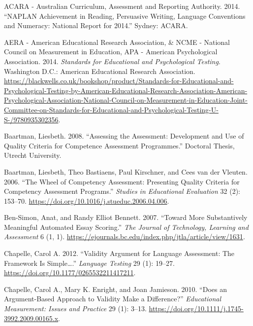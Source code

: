 \documentclass[
  letterpaper,
]{report}
\newlength{\cslhangindent}
\newlength{\cslentryspacingunit} %
\newenvironment{CSLReferences}[2] %
 {%
  \setlength{\parindent}{0pt}
  \ifodd #1
  \let\oldpar\par
  \def\par{\hangindent=\cslhangindent\oldpar}
  \fi
  \setlength{\parskip}{#2\cslentryspacingunit}
 }%
 {}
\begin{document}
\hypertarget{refs}{}
\begin{CSLReferences}{1}{0}
\leavevmode{}%
ACARA - Australian Curriculum, Assessment and Reporting Authority. 2014.
{``{NAPLAN Achievement} in {Reading}, {Persuasive Writing}, {Language
Conventions} and {Numeracy}: {National Report} for 2014.''} {Sydney}:
{ACARA}.

\leavevmode{}%
AERA - American Educational Research Association, \& NCME - National
Council on Measurement in Education, APA - American Psychological
Association. 2014. \emph{Standards for {Educational} and {Psychological
Testing}}. {Washington D.C.}: {American Educational Research
Association}.
\url{https://blackwells.co.uk/bookshop/product/Standards-for-Educational-and-Psychological-Testing-by-American-Educational-Research-Association-American-Psychological-Association-National-Council-on-Measurement-in-Education-Joint-Committee-on-Standards-for-Educational-and-Psychological-Testing-U-S-/9780935302356}.

\leavevmode{}%
Baartman, Liesbeth. 2008. {``Assessing the Assessment: {Development} and
Use of Quality Criteria for {Competence Assessment Programmes}.''}
Doctoral Thesis, {Utrecht University}.

\leavevmode{}%
Baartman, Liesbeth, Theo Bastiaens, Paul Kirschner, and Cees van der
Vleuten. 2006. {``The Wheel of Competency Assessment: {Presenting}
Quality Criteria for Competency Assessment Programs.''} \emph{Studies in
Educational Evaluation} 32 (2): 153--70.
\url{https://doi.org/10.1016/j.stueduc.2006.04.006}.

\leavevmode{}%
Ben-Simon, Anat, and Randy Elliot Bennett. 2007. {``Toward {More
Substantively Meaningful Automated Essay Scoring}.''} \emph{The Journal
of Technology, Learning and Assessment} 6 (1, 1).
\url{https://ejournals.bc.edu/index.php/jtla/article/view/1631}.

\leavevmode{}%
Chapelle, Carol A. 2012. {``Validity Argument for Language Assessment:
{The} Framework Is Simple\ldots{}.''} \emph{Language Testing} 29 (1):
19--27. \url{https://doi.org/10.1177/0265532211417211}.

\leavevmode{}%
Chapelle, Carol A., Mary K. Enright, and Joan Jamieson. 2010. {``Does an
{Argument-Based Approach} to {Validity Make} a {Difference}?''}
\emph{Educational Measurement: Issues and Practice} 29 (1): 3--13.
\url{https://doi.org/10.1111/j.1745-3992.2009.00165.x}.


\end{CSLReferences}
\end{document}
